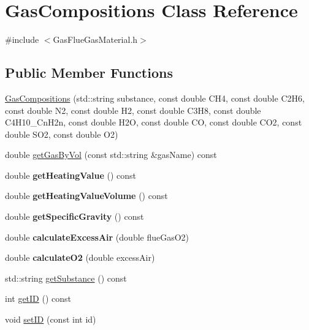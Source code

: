 \hypertarget{class_gas_compositions}{}\section{Gas\+Compositions Class Reference}
\label{class_gas_compositions}


{\ttfamily \#include $<$Gas\+Flue\+Gas\+Material.\+h$>$}

\subsection*{Public Member Functions}
\begin{DoxyCompactItemize}
\item 
\hyperlink{class_gas_compositions_ad0021d4285883374f8904f9465e41920}{Gas\+Compositions} (std\+::string substance, const double C\+H4, const double C2\+H6, const double N2, const double H2, const double C3\+H8, const double C4\+H10\+\_\+\+Cn\+H2n, const double H2O, const double CO, const double C\+O2, const double S\+O2, const double O2)
\item 
double \hyperlink{class_gas_compositions_a2028a42c136e057a6153b7bfa68d63e6}{get\+Gas\+By\+Vol} (const std\+::string \&gas\+Name) const
\item 
\mbox{\label{class_gas_compositions_a7ebcdf1c991bd70f28eb845e45d62afd}} 
double {\bfseries get\+Heating\+Value} () const
\item 
\mbox{\label{class_gas_compositions_a78803a5c2508df3fd679dca0eb378480}} 
double {\bfseries get\+Heating\+Value\+Volume} () const
\item 
\mbox{\label{class_gas_compositions_a4f891acb4f8dc3992703155c6ba7ccb0}} 
double {\bfseries get\+Specific\+Gravity} () const
\item 
\mbox{\label{class_gas_compositions_a4f6408254477960648440da460099e2d}} 
double {\bfseries calculate\+Excess\+Air} (double flue\+Gas\+O2)
\item 
\mbox{\label{class_gas_compositions_afc573b87fb7e7b99803b22470c402592}} 
double {\bfseries calculate\+O2} (double excess\+Air)
\item 
std\+::string \hyperlink{class_gas_compositions_abad9554bca9b68cd970eae11bdd3c505}{get\+Substance} () const
\item 
int \hyperlink{class_gas_compositions_a9668decdb2b5065c8ee3c59c207b9d51}{get\+ID} () const
\item 
void \hyperlink{class_gas_compositions_a9fc3ebfcbda7134b67ed76a39b4c94cc}{set\+ID} (const int id)
\end{DoxyCompactItemize}
